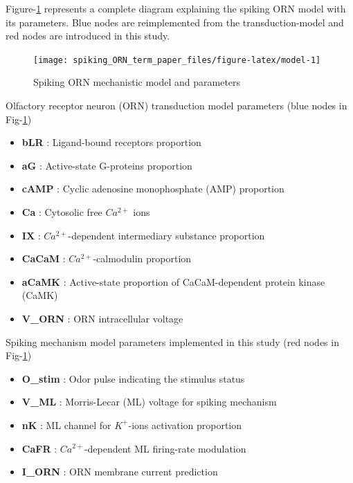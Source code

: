 \documentclass[
]{article}
\providecommand{\tightlist}{%
  \setlength{\itemsep}{0pt}\setlength{\parskip}{0pt}}
\begin{document}
Figure-\ref{fig:model} represents a complete diagram explaining the spiking ORN model with its parameters. Blue nodes are reimplemented from the transduction-model and red nodes are introduced in this study.

\begin{figure}

{\centering \texttt{[image: spiking\_ORN\_term\_paper\_files/figure-latex/model-1]} 

}

\caption{Spiking ORN mechanistic model and parameters}\label{fig:model}
\end{figure}

Olfactory receptor neuron (ORN) transduction model parameters (blue nodes in Fig-\ref{fig:model})

\begin{itemize}
\tightlist
\item
  \textbf{bLR} : Ligand-bound receptors proportion
\item
  \textbf{aG} : Active-state G-proteins proportion
\item
  \textbf{cAMP} : Cyclic adenosine monophosphate (AMP) proportion
\item
  \textbf{Ca} : Cytosolic free \(Ca^{2+}\) ions
\item
  \textbf{IX} : \(Ca^{2+}\)-dependent intermediary substance proportion
\item
  \textbf{CaCaM} : \(Ca^{2+}\)-calmodulin proportion
\item
  \textbf{aCaMK} : Active-state proportion of CaCaM-dependent protein kinase (CaMK)
\item
  \textbf{V\_ORN} : ORN intracellular voltage
\end{itemize}

Spiking mechanism model parameters implemented in this study (red nodes in Fig-\ref{fig:model})

\begin{itemize}
\tightlist
\item
  \textbf{O\_stim} : Odor pulse indicating the stimulus status
\item
  \textbf{V\_ML} : Morris-Lecar (ML) voltage for spiking mechanism
\item
  \textbf{nK} : ML channel for \(K^+\)-ions activation proportion
\item
  \textbf{CaFR} : \(Ca^{2+}\)-dependent ML firing-rate modulation
\item
  \textbf{I\_ORN} : ORN membrane current prediction
\end{itemize}
\end{document}
